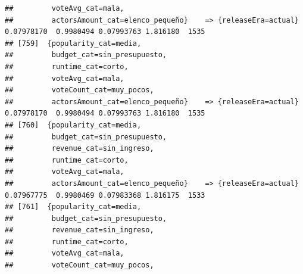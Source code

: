 \documentclass[
]{article}
\begin{document}
\begin{verbatim}
##         voteAvg_cat=mala,                                                                                                       
##         actorsAmount_cat=elenco_pequeño}    => {releaseEra=actual}               0.07978170  0.9980494 0.07993763 1.816180  1535
## [759]  {popularity_cat=media,                                                                                                   
##         budget_cat=sin_presupuesto,                                                                                             
##         runtime_cat=corto,                                                                                                      
##         voteAvg_cat=mala,                                                                                                       
##         voteCount_cat=muy_pocos,                                                                                                
##         actorsAmount_cat=elenco_pequeño}    => {releaseEra=actual}               0.07978170  0.9980494 0.07993763 1.816180  1535
## [760]  {popularity_cat=media,                                                                                                   
##         budget_cat=sin_presupuesto,                                                                                             
##         revenue_cat=sin_ingreso,                                                                                                
##         runtime_cat=corto,                                                                                                      
##         voteAvg_cat=mala,                                                                                                       
##         actorsAmount_cat=elenco_pequeño}    => {releaseEra=actual}               0.07967775  0.9980469 0.07983368 1.816175  1533
## [761]  {popularity_cat=media,                                                                                                   
##         budget_cat=sin_presupuesto,                                                                                             
##         revenue_cat=sin_ingreso,                                                                                                
##         runtime_cat=corto,                                                                                                      
##         voteAvg_cat=mala,                                                                                                       
##         voteCount_cat=muy_pocos,                                                                                                

\end{verbatim}
\end{document}
